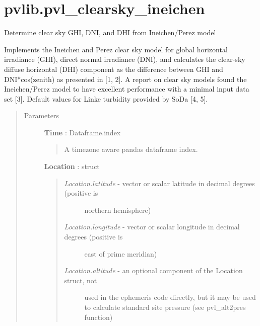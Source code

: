 \documentclass[letterpaper,10pt,english]{sphinxmanual}
\begin{document}
\section{pvlib.pvl\_clearsky\_ineichen}
\label{stubs/pvlib.pvl_clearsky_ineichen::doc}\label{stubs/pvlib.pvl_clearsky_ineichen:pvlib-pvl-clearsky-ineichen}

\begin{fulllineitems}
\label{stubs/pvlib.pvl_clearsky_ineichen:pvlib.pvl_clearsky_ineichen}
Determine clear sky GHI, DNI, and DHI from Ineichen/Perez model

Implements the Ineichen and Perez clear sky model for global horizontal
irradiance (GHI), direct normal irradiance (DNI), and calculates
the clear-sky diffuse horizontal (DHI) component as the difference
between GHI and DNI*cos(zenith) as presented in {[}1, 2{]}. A report on clear
sky models found the Ineichen/Perez model to have excellent performance
with a minimal input data set {[}3{]}. Default values for Linke turbidity
provided by SoDa {[}4, 5{]}.
\begin{quote}\begin{description}
\item[{Parameters}] \leavevmode
\textbf{Time} : Dataframe.index
\begin{quote}

A timezone aware pandas dataframe index.
\end{quote}

\textbf{Location} : struct
\begin{quote}
\begin{description}
\item[{\emph{Location.latitude} - vector or scalar latitude in decimal degrees (positive is}] \leavevmode
northern hemisphere)

\item[{\emph{Location.longitude} - vector or scalar longitude in decimal degrees (positive is }] \leavevmode
east of prime meridian)

\item[{\emph{Location.altitude} - an optional component of the Location struct, not}] \leavevmode
used in the ephemeris code directly, but it may be used to calculate
standard site pressure (see pvl\_alt2pres function)

\end{description}


\end{quote}
\end{description}
\end{quote}
\end{fulllineitems}
\end{document}
